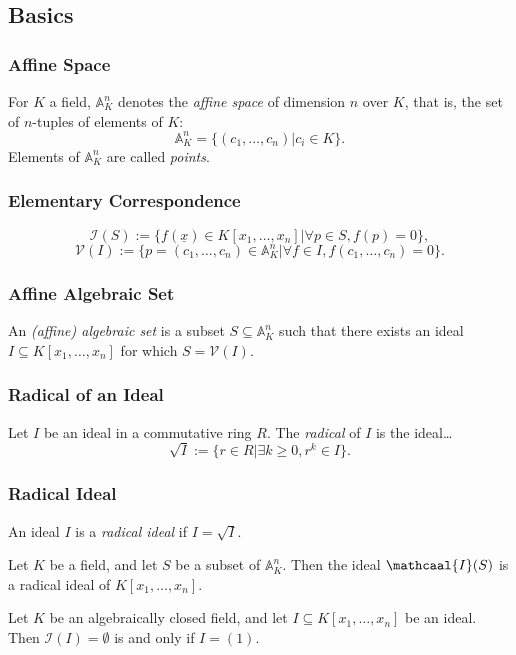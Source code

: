\subsection{Basics}

\subsubsection{Affine Space}
For $K$ a field, $\mathbb{A}^n_K$ denotes the \emph{affine space} of dimension $n$ over $K$, that is, the set of $n$-tuples of elements of $K$:
$$\mathbb{A}^n_K = \{(c_1,\dots,c_n) | c_i \in K \}.$$
Elements of $\mathbb{A}^n_K$ are called \emph{points}.

\subsubsection{Elementary Correspondence}

$$\mathcal{I}(S) := \{ f(\underline{x}) \in K[x_1, \dots, x_n] | \forall p \in S, f(p) = 0 \},$$
$$\mathcal{V}(I) := \{ p = (c_1,\dots, c_n) \in \mathbb{A}^n_K | \forall f \in I, f(c_1, \dots, c_n) = 0\}.$$

\subsubsection{Affine Algebraic Set}
An \emph{(affine) algebraic set} is a subset $S \subseteq \mathbb{A}^n_K$ such that there exists an ideal $I \subseteq K[x_1, \dots, x_n]$
for which $S = \mathcal{V}(I)$.

\subsubsection{Radical of an Ideal}
Let $I$ be an ideal in a commutative ring $R$. The \emph{radical} of $I$ is the ideal\dots
$$\sqrt{I} := \{ r \in R | \exists k \geq 0, r^k \in I \}.$$

\subsubsection{Radical Ideal}
An ideal $I$ is a \emph{radical ideal} if $I = \sqrt{I}$.

\begin{lemma}
Let $K$ be a field, and let $S$ be a subset of $\mathbb{A}^n_K$. Then the ideal $\mathcaal{I}(S)$ is a radical
ideal of $K[x_1, \dots, x_n]$.
\end{lemma}

\begin{proposition}
Let $K$ be an algebraically closed field, and let $I \subseteq K[x_1,\dots,x_n]$ be an ideal.
Then $\mathcal{I}(I) = \emptyset$ is and only if $I = (1)$.
\end{proposition}

